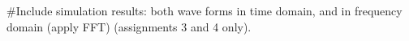 #Include simulation results: both wave forms in time domain, and in frequency domain (apply FFT) (assignments 3 and 4 only).
